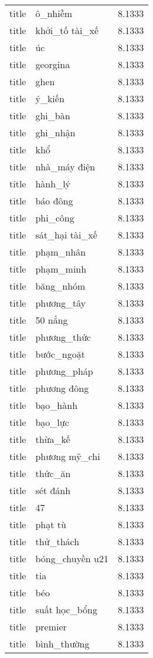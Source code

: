\documentclass{article}
\begin{document}
\begin{tabular}{lll}
title & ô\_nhiễm & 8.1333\\
title & khởi\_tố tài\_xế & 8.1333\\
title & úc & 8.1333\\
title & georgina & 8.1333\\
title & ghen & 8.1333\\
title & ý\_kiến & 8.1333\\
title & ghi\_bàn & 8.1333\\
title & ghi\_nhận & 8.1333\\
title & khổ & 8.1333\\
title & nhà\_máy điện & 8.1333\\
title & hành\_lý & 8.1333\\
title & báo đông & 8.1333\\
title & phi\_công & 8.1333\\
title & sát\_hại tài\_xế & 8.1333\\
title & phạm\_nhân & 8.1333\\
title & phạm\_minh & 8.1333\\
title & băng\_nhóm & 8.1333\\
title & phương\_tây & 8.1333\\
title & 50 nắng & 8.1333\\
title & phương\_thức & 8.1333\\
title & bước\_ngoặt & 8.1333\\
title & phương\_pháp & 8.1333\\
title & phương đông & 8.1333\\
title & bạo\_hành & 8.1333\\
title & bạo\_lực & 8.1333\\
title & thừa\_kế & 8.1333\\
title & phương mỹ\_chi & 8.1333\\
title & thức\_ăn & 8.1333\\
title & sét đánh & 8.1333\\
title & 47 & 8.1333\\
title & phạt tù & 8.1333\\
title & thử\_thách & 8.1333\\
title & bóng\_chuyền u21 & 8.1333\\
title & tia & 8.1333\\
title & béo & 8.1333\\
title & suất học\_bổng & 8.1333\\
title & premier & 8.1333\\
title & bình\_thường & 8.1333\\

\end{tabular}
\end{document}
